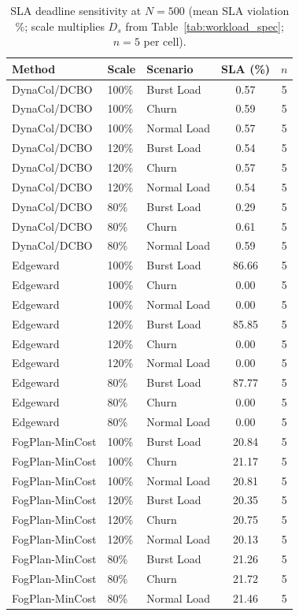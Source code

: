 \begin{table}[t]
\centering
\caption{SLA deadline sensitivity at $N=500$ (mean SLA violation \%; scale multiplies $D_s$ from Table~\ref{tab:workload_spec}; $n=5$ per cell).}
\label{tab:sla_deadline}
\fgcsTableCol
\begin{tabular*}{\columnwidth}{@{\extracolsep{\fill}}@{}lllcc@{}@{}}
\toprule
\textbf{Method} & \textbf{Scale} & \textbf{Scenario} & \textbf{SLA (\%)} & \textbf{$n$} \\
\midrule
DynaCol/DCBO & 100\% & Burst Load & 0.57 & 5 \\
DynaCol/DCBO & 100\% & Churn & 0.59 & 5 \\
DynaCol/DCBO & 100\% & Normal Load & 0.57 & 5 \\
DynaCol/DCBO & 120\% & Burst Load & 0.54 & 5 \\
DynaCol/DCBO & 120\% & Churn & 0.57 & 5 \\
DynaCol/DCBO & 120\% & Normal Load & 0.54 & 5 \\
DynaCol/DCBO & 80\% & Burst Load & 0.29 & 5 \\
DynaCol/DCBO & 80\% & Churn & 0.61 & 5 \\
DynaCol/DCBO & 80\% & Normal Load & 0.59 & 5 \\
Edgeward & 100\% & Burst Load & 86.66 & 5 \\
Edgeward & 100\% & Churn & 0.00 & 5 \\
Edgeward & 100\% & Normal Load & 0.00 & 5 \\
Edgeward & 120\% & Burst Load & 85.85 & 5 \\
Edgeward & 120\% & Churn & 0.00 & 5 \\
Edgeward & 120\% & Normal Load & 0.00 & 5 \\
Edgeward & 80\% & Burst Load & 87.77 & 5 \\
Edgeward & 80\% & Churn & 0.00 & 5 \\
Edgeward & 80\% & Normal Load & 0.00 & 5 \\
FogPlan-MinCost & 100\% & Burst Load & 20.84 & 5 \\
FogPlan-MinCost & 100\% & Churn & 21.17 & 5 \\
FogPlan-MinCost & 100\% & Normal Load & 20.81 & 5 \\
FogPlan-MinCost & 120\% & Burst Load & 20.35 & 5 \\
FogPlan-MinCost & 120\% & Churn & 20.75 & 5 \\
FogPlan-MinCost & 120\% & Normal Load & 20.13 & 5 \\
FogPlan-MinCost & 80\% & Burst Load & 21.26 & 5 \\
FogPlan-MinCost & 80\% & Churn & 21.72 & 5 \\
FogPlan-MinCost & 80\% & Normal Load & 21.46 & 5 \\
\bottomrule
\end{tabular*}
\end{table}